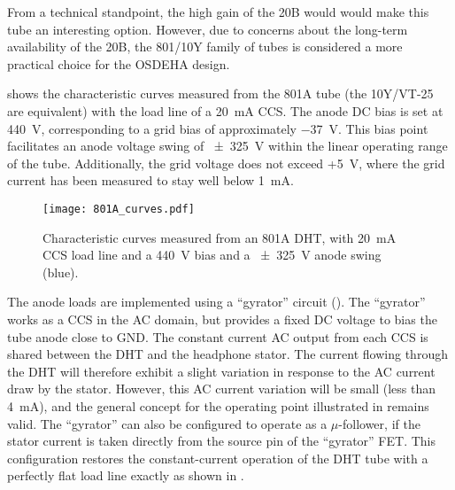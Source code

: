 From a technical standpoint, the high gain of the 20B would would make this tube an interesting option. However, due to concerns about the long-term availability of the 20B, the 801/10Y family of tubes is considered a more practical choice for the OSDEHA design.

 shows the characteristic curves measured from the 801A tube (the 10Y/VT-25 are equivalent) with the load line of a \SI{20}{mA} CCS. The anode DC bias is set at \SI{440}{V}, corresponding to a grid bias of approximately \SI{-37}{V}. This bias point facilitates an anode voltage swing of \SI{\pm325}{V} within the linear operating range of the tube. Additionally, the grid voltage does not exceed +\SI{5}{V}, where the grid current has been measured to stay well below \SI{1}{mA}.


\begin{figure}
\begin{center}
\texttt{[image: 801A\_curves.pdf]}
\caption{Characteristic curves measured from an 801A DHT, with \SI{20}{mA} CCS load line and a \SI{440}{V} bias and a \SI{\pm325}{V} anode swing (blue).}
\end{center}
\end{figure}

The anode loads are implemented using a ``gyrator'' circuit \cite{mogliaa_gyrator} (). The ``gyrator'' works as a CCS in the AC domain, but provides a fixed DC voltage to bias the tube anode close to GND. The constant current AC output from each CCS is shared between the DHT and the headphone stator. The current flowing through the DHT will therefore exhibit a slight variation in response to the AC current draw by the stator. However, this AC current variation will be small (less than \SI{4}{mA})\cite{osdeha_p8}, and the general concept for the operating point illustrated in  remains valid. The ``gyrator'' can also be configured to operate as a $\mu$-follower\cite{pimm_ccs,kimmel_mustage}, if the stator current is taken directly from the source pin of the ``gyrator'' FET. This configuration restores the constant-current operation of the DHT tube with a perfectly flat load line exactly as shown in .


